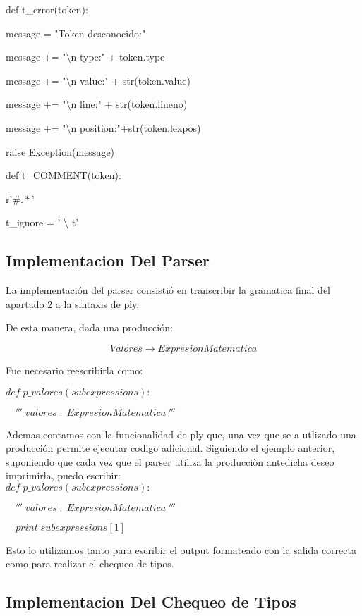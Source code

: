 \begin{multicols}{2}

def t\_error(token):

 \hspace{2mm}message = "Token desconocido:"
    
\hspace{2mm}message += "$\setminus$n type:" + token.type
    
\hspace{2mm}message += "$\setminus$n value:" + str(token.value)
    
\hspace{2mm}message += "$\setminus$n line:" + str(token.lineno)
    
\hspace{2mm}message += "$\setminus$n position:"+str(token.lexpos)
    
\hspace{2mm}raise Exception(message)
  

\columnbreak

def t\_COMMENT(token):

\hspace{2mm}    r'$\#.*$'

t\_ignore  = ' $\setminus$ t'

\end{multicols}

\subsection{Implementacion Del Parser}

La implementación del parser consistió en transcribir la gramatica final del apartado $2$ a la sintaxis de ply.

De esta manera, dada una producción:

$$Valores \rightarrow ExpresionMatematica$$

Fue necesario reescribirla como:


$def\; p\_valores(subexpressions):$

$\quad'''\; valores\; :\; ExpresionMatematica\;'''$


Ademas contamos con la funcionalidad de ply que, una vez que se a utlizado una producción permite ejecutar codigo adicional. Siguiendo el ejemplo anterior, suponiendo que cada vez que el parser utiliza la producciòn antedicha deseo imprimirla, puedo escribir:
\\

$def\; p\_valores(subexpressions):$

$\quad'''\; valores\; :\; ExpresionMatematica\;'''$

$\quad print\; subexpressions[1]$


Esto lo utilizamos tanto para escribir el output formateado con la salida correcta como para realizar el chequeo de tipos.

\subsection{Implementacion Del Chequeo de Tipos}
